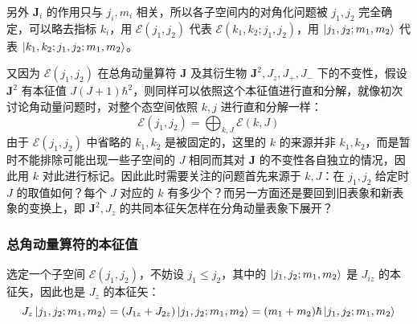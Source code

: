 \documentclass[cn,10pt,math=newtx,citestyle=gb7714-2015,bibstyle=gb7714-2015]{elegantbook}
\def\bm{\boldsymbol}
\def\ms{\mathscr}
\begin{document}
另外 $\bm J_i$ 的作用只与 $j_i,m_i$ 相关，所以各子空间内的对角化问题被 $j_1,j_2$ 完全确定，可以略去指标 $k_i$，用 $\ms E(j_1,j_2)$ 代表 $\ms E(k_1,k_2;j_1,j_2)$，用 $\ket{j_1,j_2;m_1,m_2}$ 代表 $\ket{k_1,k_2;j_1,j_2;m_1,m_2}$。

又因为 $\ms E(j_1,j_2)$ 在总角动量算符 $\bm J$ 及其衍生物 $\bm J^2,J_z,J_+,J_-$ 下的不变性，假设 $\bm J^2$ 有本征值 $J(J+1)\hbar^2$，则同样可以依照这个本征值进行直和分解，就像初次讨论角动量问题时，对整个态空间依照 $k,j$ 进行直和分解一样：
\begin{equation}
    \ms E(j_1,j_2) = \bigoplus_{k,J}\ms E(k,J)
\end{equation}
由于 $\ms E(j_1,j_2)$ 中省略的 $k_1,k_2$ 是被固定的，这里的 $k$ 的来源并非 $k_1,k_2$，而是暂时不能排除可能出现一些子空间的 $J$ 相同而其对 $\bm J$ 的不变性各自独立的情况，因此用 $k$ 对此进行标记。因此此时需要关注的问题首先来源于 $k,J$：在 $j_1,j_2$ 给定时 $J$ 的取值如何？每个 $J$ 对应的 $k$ 有多少个？而另一方面还是要回到旧表象和新表象的变换上，即 $\bm J^2,J_z$ 的共同本征矢怎样在分角动量表象下展开？

\subsubsection{总角动量算符的本征值}
选定一个子空间 $\ms E(j_1,j_2)$，不妨设 $j_1\le j_2$，其中的 $\ket{j_1,j_2;m_1,m_2}$ 是 $J_{iz}$ 的本征矢，因此也是 $J_z$ 的本征矢：
\begin{equation}
    J_z\ket{j_1,j_2;m_1,m_2} = (J_{1z}+J_{2z})\ket{j_1,j_2;m_1,m_2} = (m_1+m_2)\hbar\ket{j_1,j_2;m_1,m_2}
\end{equation}
\end{document}
